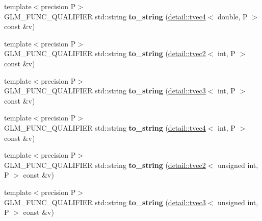 \begin{DoxyCompactItemize}
\item 
\hypertarget{namespaceglm_adc1be9dcab5836c228189fd8df32c4f2}{{\footnotesize template$<$precision P$>$ }\\G\-L\-M\-\_\-\-F\-U\-N\-C\-\_\-\-Q\-U\-A\-L\-I\-F\-I\-E\-R std\-::string {\bfseries to\-\_\-string} (\hyperlink{structglm_1_1detail_1_1tvec4}{detail\-::tvec4}$<$ double, P $>$ const \&v)}\label{namespaceglm_adc1be9dcab5836c228189fd8df32c4f2}

\item 
\hypertarget{namespaceglm_acf6a59b44afdda0d868ded648576d48f}{{\footnotesize template$<$precision P$>$ }\\G\-L\-M\-\_\-\-F\-U\-N\-C\-\_\-\-Q\-U\-A\-L\-I\-F\-I\-E\-R std\-::string {\bfseries to\-\_\-string} (\hyperlink{structglm_1_1detail_1_1tvec2}{detail\-::tvec2}$<$ int, P $>$ const \&v)}\label{namespaceglm_acf6a59b44afdda0d868ded648576d48f}

\item 
\hypertarget{namespaceglm_a79470a720acf0a316891820afe09e162}{{\footnotesize template$<$precision P$>$ }\\G\-L\-M\-\_\-\-F\-U\-N\-C\-\_\-\-Q\-U\-A\-L\-I\-F\-I\-E\-R std\-::string {\bfseries to\-\_\-string} (\hyperlink{structglm_1_1detail_1_1tvec3}{detail\-::tvec3}$<$ int, P $>$ const \&v)}\label{namespaceglm_a79470a720acf0a316891820afe09e162}

\item 
\hypertarget{namespaceglm_a78dd6af1769c80de03bb124d73e274f2}{{\footnotesize template$<$precision P$>$ }\\G\-L\-M\-\_\-\-F\-U\-N\-C\-\_\-\-Q\-U\-A\-L\-I\-F\-I\-E\-R std\-::string {\bfseries to\-\_\-string} (\hyperlink{structglm_1_1detail_1_1tvec4}{detail\-::tvec4}$<$ int, P $>$ const \&v)}\label{namespaceglm_a78dd6af1769c80de03bb124d73e274f2}

\item 
\hypertarget{namespaceglm_a801319a82197f1c81cd8ec003bbb73d0}{{\footnotesize template$<$precision P$>$ }\\G\-L\-M\-\_\-\-F\-U\-N\-C\-\_\-\-Q\-U\-A\-L\-I\-F\-I\-E\-R std\-::string {\bfseries to\-\_\-string} (\hyperlink{structglm_1_1detail_1_1tvec2}{detail\-::tvec2}$<$ unsigned int, P $>$ const \&v)}\label{namespaceglm_a801319a82197f1c81cd8ec003bbb73d0}

\item 
\hypertarget{namespaceglm_a696c89ed265323c985319eecccf3ddc8}{{\footnotesize template$<$precision P$>$ }\\G\-L\-M\-\_\-\-F\-U\-N\-C\-\_\-\-Q\-U\-A\-L\-I\-F\-I\-E\-R std\-::string {\bfseries to\-\_\-string} (\hyperlink{structglm_1_1detail_1_1tvec3}{detail\-::tvec3}$<$ unsigned int, P $>$ const \&v)}\label{namespaceglm_a696c89ed265323c985319eecccf3ddc8}


\end{DoxyCompactItemize}
